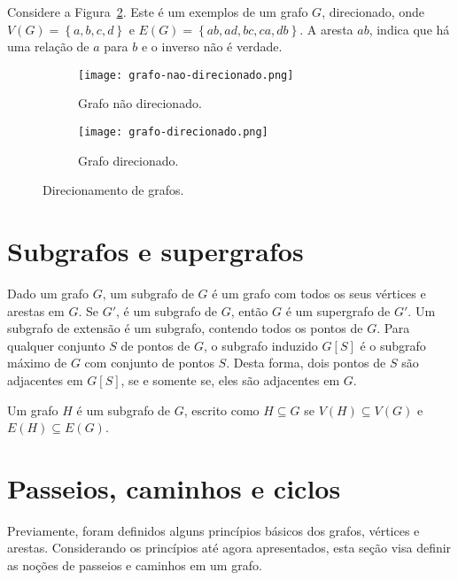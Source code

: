 Considere a Figura~\ref{sec2:ex-grafo-direcionado}. Este é um exemplos de um grafo $G$, direcionado, onde $V(G) = \left\{a, b, c, d\right\} $ e $E(G) = \left\{ab, ad, bc, ca, db\right\} $. A aresta $ab$, indica que há uma relação de $a$ para $b$ e o inverso não é verdade.

\begin{figure}[!htb]
    \centering
    \begin{subfigure}{.5\textwidth}
        \centering
        \texttt{[image: grafo-nao-direcionado.png]}
        \caption{Grafo não direcionado.}
        \label{sec2:ex-grafo-nao-direcionado}
    \end{subfigure}%
    \begin{subfigure}{.5\textwidth}
        \centering
        \texttt{[image: grafo-direcionado.png]}
        \caption{Grafo direcionado.}
        \label{sec2:ex-grafo-direcionado}
    \end{subfigure}
    \caption{Direcionamento de grafos.}
    \label{sec2:direcionamento_grafos}
\end{figure}

\section{Subgrafos e supergrafos}
Dado um grafo $G$, um subgrafo de $G$ é um grafo com todos os seus vértices e arestas em $G$. Se $G'$, é um subgrafo de $G$, então $G$ é um supergrafo de $G'$. Um subgrafo de extensão é um subgrafo, contendo todos os pontos de $G$. Para qualquer conjunto $S$ de pontos de $G$, o subgrafo induzido $G[S]$ é o subgrafo máximo de $G$ com conjunto de pontos $S$. Desta forma, dois pontos de $S$ são adjacentes em $G[S]$, se e somente se, eles são adjacentes em $G$.

\begin{definition}
    Um grafo $H$ é um subgrafo de $G$, escrito como $H\subseteq G$ se $V(H) \subseteq V(G)$ e $E(H) \subseteq E(G)$.
\end{definition}

\section{Passeios, caminhos e ciclos}
Previamente, foram definidos alguns princípios básicos dos grafos, vértices e arestas. Considerando os princípios até agora apresentados, esta seção visa definir as noções de passeios e caminhos em um grafo.

